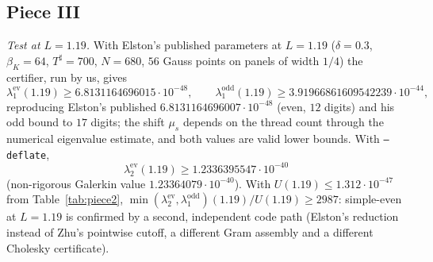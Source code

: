 \documentclass[11pt]{amsart}
\newcommand{\ev}{\mathrm{ev}}
\newcommand{\od}{\mathrm{odd}}
\newcommand{\Tsh}{T^{\sharp}}
\newcommand{\e}[1]{\cdot 10^{#1}}
\theoremstyle{definition}
\theoremstyle{remark}
\numberwithin{equation}{section}
\begin{document}
\subsection{Piece III}\label{sec:results3}
\emph{Test at $L=1.19$.} With Elston's published parameters at $L=1.19$ ($\delta=0.3$, $\beta_K=64$, $\Tsh=700$, $N=680$, $56$ Gauss points on panels of width $1/4$) the certifier, run by us, gives
\[
\lambda_1^\ev(1.19)\ge6.8131164696015\e{-48},\qquad \lambda_1^\od(1.19)\ge3.91966861609542239\e{-44},
\]
reproducing Elston's published $6.8131164696007\e{-48}$ (even, $12$ digits) and his odd bound to $17$ digits; the shift $\mu_s$ depends on the thread count through the numerical eigenvalue estimate, and both values are valid lower bounds. With \texttt{--deflate},
\[
\lambda_2^\ev(1.19)\ge1.2336395547\e{-40}
\]
(non-rigorous Galerkin value $1.23364079\e{-40}$). With $U(1.19)\le1.312\e{-47}$ from Table~\ref{tab:piece2}, $\min(\lambda_2^\ev,\lambda_1^\od)(1.19)/U(1.19)\ge2987$: simple-even at $L=1.19$ is confirmed by a second, independent code path (Elston's reduction instead of Zhu's pointwise cutoff, a different Gram assembly and a different Cholesky certificate).
\end{document}
